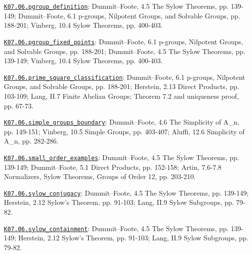 \par\smallskip\noindent\hypertarget{src:K07.06.pgroup_definition}{}\label{src:K07.06.pgroup_definition}\hyperref[K07.06.pgroup_definition]{\texttt{K07.06.pgroup\_definition}}: Dummit--Foote, 4.5 The Sylow Theorems, pp. 139-149; Dummit--Foote, 6.1 p-groups, Nilpotent Groups, and Solvable Groups, pp. 188-201; Vinberg, 10.4 Sylow Theorems, pp. 400-403.
\par\smallskip\noindent\hypertarget{src:K07.06.pgroup_fixed_points}{}\label{src:K07.06.pgroup_fixed_points}\hyperref[K07.06.pgroup_fixed_points]{\texttt{K07.06.pgroup\_fixed\_points}}: Dummit--Foote, 6.1 p-groups, Nilpotent Groups, and Solvable Groups, pp. 188-201; Dummit--Foote, 4.5 The Sylow Theorems, pp. 139-149; Vinberg, 10.4 Sylow Theorems, pp. 400-403.
\par\smallskip\noindent\hypertarget{src:K07.06.prime_square_classification}{}\label{src:K07.06.prime_square_classification}\hyperref[K07.06.prime_square_classification]{\texttt{K07.06.prime\_square\_classification}}: Dummit--Foote, 6.1 p-groups, Nilpotent Groups, and Solvable Groups, pp. 188-201; Herstein, 2.13 Direct Products, pp. 103-109; Lang, II.7 Finite Abelian Groups; Theorem 7.2 and uniqueness proof, pp. 67-73.
\par\smallskip\noindent\hypertarget{src:K07.06.simple_groups_boundary}{}\label{src:K07.06.simple_groups_boundary}\hyperref[K07.06.simple_groups_boundary]{\texttt{K07.06.simple\_groups\_boundary}}: Dummit--Foote, 4.6 The Simplicity of A\_n, pp. 149-151; Vinberg, 10.5 Simple Groups, pp. 403-407; Aluffi, 12.6 Simplicity of A\_n, pp. 282-286.
\par\smallskip\noindent\hypertarget{src:K07.06.small_order_examples}{}\label{src:K07.06.small_order_examples}\hyperref[K07.06.small_order_examples]{\texttt{K07.06.small\_order\_examples}}: Dummit--Foote, 4.5 The Sylow Theorems, pp. 139-149; Dummit--Foote, 5.1 Direct Products, pp. 152-158; Artin, 7.6-7.8 Normalizers, Sylow Theorems, Groups of Order 12, pp. 203-210.
\par\smallskip\noindent\hypertarget{src:K07.06.sylow_conjugacy}{}\label{src:K07.06.sylow_conjugacy}\hyperref[K07.06.sylow_conjugacy]{\texttt{K07.06.sylow\_conjugacy}}: Dummit--Foote, 4.5 The Sylow Theorems, pp. 139-149; Herstein, 2.12 Sylow's Theorem, pp. 91-103; Lang, II.9 Sylow Subgroups, pp. 79-82.
\par\smallskip\noindent\hypertarget{src:K07.06.sylow_containment}{}\label{src:K07.06.sylow_containment}\hyperref[K07.06.sylow_containment]{\texttt{K07.06.sylow\_containment}}: Dummit--Foote, 4.5 The Sylow Theorems, pp. 139-149; Herstein, 2.12 Sylow's Theorem, pp. 91-103; Lang, II.9 Sylow Subgroups, pp. 79-82.
